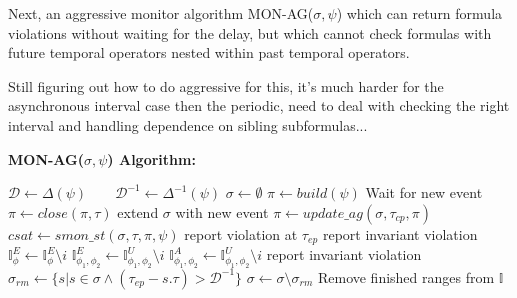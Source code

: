 \documentclass[10pt,a4paper]{article}
\newcommand{\ep}{ep}
\begin{document}
Next, an aggressive monitor algorithm MON-AG($\sigma, \psi$) which can return formula violations without waiting for the delay, but which cannot check formulas with future temporal operators nested within past temporal operators.

Still figuring out how to do aggressive for this, it's much harder for the asynchronous interval case then the periodic, need to deal with checking the right interval and handling dependence on sibling subformulas...


\textbf{MON-AG($\sigma, \psi$) Algorithm:}
\begin{algorithmic}[1]
\STATE $\mathcal{D} \leftarrow \Delta(\psi) \quad \quad \mathcal{D}^{-1} \leftarrow \Delta^{-1}(\psi)$
\STATE $\sigma \leftarrow \emptyset$
\STATE $\pi \leftarrow build(\psi)$
\LOOP
\STATE Wait for new event
\STATE $\pi \leftarrow close(\pi, \tau)$ 
\STATE extend $\sigma$ with new event
\STATE $\pi \leftarrow update\_ag(\sigma, \tau_{cp}, \pi)$
\STATE $csat \leftarrow smon\_st(\sigma, \tau, \pi, \psi)$
\STATE report violation at $\tau_{\ep}$
\ENDIF
\STATE report invariant violation
\ENDIF
\ENDFOR
\STATE $\mathbb{I}^{E}_{\phi} \leftarrow \mathbb{I}^{E}_{\phi} \setminus i$
\ENDIF
\ENDFOR
\STATE $\mathbb{I}^{E}_{\phi_1,\phi_2} \leftarrow \mathbb{I}^{U}_{\phi_1,\phi_2} \setminus i$
\STATE $\mathbb{I}^{A}_{\phi_1,\phi_2} \leftarrow \mathbb{I}^{U}_{\phi_1,\phi_2} \setminus i$
\ENDIF
{}
\STATE report invariant violation
\ENDIF
\ENDFOR
\STATE $\sigma_{rm} \leftarrow \{ s | s \in \sigma \wedge (\tau_{\ep} - s.\tau) > \mathcal{D}^{-1} \}$
\STATE $\sigma \leftarrow \sigma \setminus \sigma_{rm}$
\STATE Remove finished ranges from $\mathbb{I}$
\ENDLOOP
\end{algorithmic}
\end{document}
